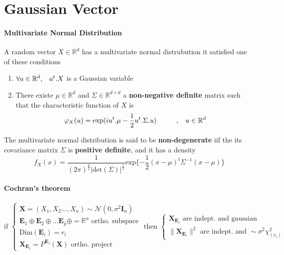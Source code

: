 \documentclass[a4paper,10pt]{article}
\begin{document}
\appendix
\section{Gaussian Vector}
\paragraph{Multivariate Normal Distribution}
A random vector $X\in \mathbb{R}^d$ has a multivariate normal distrubution it satisfied one of these conditions
\begin{enumerate}
 \item $\forall a \in \mathbb{R}^d, \hspace{3mm} a^{t}.X$ is a Gaussian variable
 \item There existe $\mu \in \mathbb{R}^d$ and $\Sigma \in \mathbb{R}^{d\times d}$ a \textbf{non-negative definite} matrix such that the characteristic function of $X$ is
 \[
  \varphi_{X}(u)     =  \text{exp}(i u^{t} .\mu  - \frac{1}{2} u^{t} .\Sigma. u) \hspace{10mm},\hspace{3mm} u\in\mathbb{R}^d
 \]
\end{enumerate}
The multivariate normal distribution is said to be \textbf{non-degenerate} iif the its covariance matrix $\Sigma$ is \textbf{positive definite}, and it has a density 
\[
f_{X}(x) = \frac{1}{ (2\pi)^{\frac{d}{2}} |\text{det}(\Sigma)|^{\frac{1}{2}} } \text{exp}\{ -\frac{1}{2} (x-\mu)^{t} \Sigma^{-1} (x-\mu) \}
\]
\paragraph{Cochran's theorem}
\[
\text{if }
\left\{
\begin{array}{l}
\textbf{X} = (X_1,X_2 ...,X_n) \sim \mathcal{N}(0, \sigma^2 \textbf{I}_n) \\
\textbf{E}_1\oplus\textbf{E}_2\oplus ... \textbf{E}_p\oplus = \mathbb{R}^n \text{ ortho. subspace} \\
\text{Dim}(\textbf{E}_i) = r_i   \\
\textbf{X}_{\textbf{E}_i} = P^{\textbf{E}_i}(\textbf{X}) \text{ ortho. project} 
\end{array}\right.
\text{ then }
\left\{
\begin{array}{l}
\textbf{X}_{\textbf{E}_i} \text{ are indept. and gaussian} \\
 \| \textbf{X}_{\textbf{E}_i} \|^{2} \text{ are indept. and } \sim \sigma^2\chi^2_{(r_i)}
\end{array}\right.
\]
\end{document}
